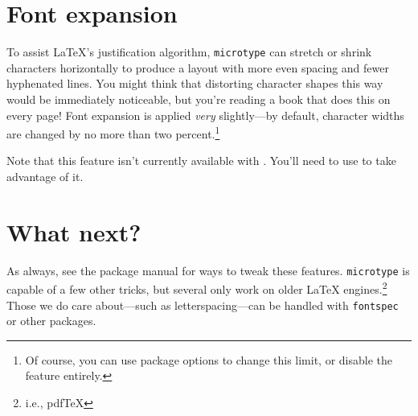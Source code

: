 \section{Font expansion}

To assist \LaTeX's justification algorithm,
\texttt{microtype} can
stretch or shrink characters horizontally to produce a layout
with more even spacing and fewer hyphenated lines.
You might think that distorting character shapes this way would be immediately
noticeable,
but you're reading a book that does this on every page!
Font expansion is applied \emph{very} slightly---by default,
character widths are changed by no more than two percent.\punckern\footnote{%
Of course, you can use package options to change this limit,
or disable the feature entirely.}

Note that this feature isn't currently available with \XeLaTeX{}.
You'll need to use \LuaLaTeX{} to take advantage of it.

\section{What next?}

As always, see the package manual for ways to tweak these features.
\texttt{microtype} is capable of a few other tricks,
but several only work on older \LaTeX{} engines.\punckern\footnote{i.e., pdf\TeX}
Those we do care about---such as letterspacing---can be handled with
\texttt{fontspec} or other packages.
